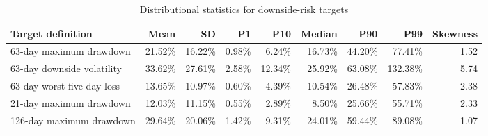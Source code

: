 \begin{table}[!htbp]
    \centering
    \scriptsize
    \setlength{\tabcolsep}{4pt}
    \caption{Distributional statistics for downside-risk targets}
    \label{tab:target_statistics}
    \begin{tabular}{lrrrrrrrr}
        \toprule
        Target definition & Mean & SD & P1 & P10 & Median & P90 & P99 & Skewness \\
        \midrule
        63-day maximum drawdown & 21.52\% & 16.22\% & 0.98\% & 6.24\% & 16.73\% & 44.20\% & 77.41\% & 1.52 \\
        63-day downside volatility & 33.62\% & 27.61\% & 2.58\% & 12.34\% & 25.92\% & 63.08\% & 132.38\% & 5.74 \\
        63-day worst five-day loss & 13.65\% & 10.97\% & 0.60\% & 4.39\% & 10.54\% & 26.48\% & 57.83\% & 2.38 \\
        21-day maximum drawdown & 12.03\% & 11.15\% & 0.55\% & 2.89\% & 8.50\% & 25.66\% & 55.71\% & 2.33 \\
        126-day maximum drawdown & 29.64\% & 20.06\% & 1.42\% & 9.31\% & 24.01\% & 59.44\% & 89.08\% & 1.07 \\
        \bottomrule
    \end{tabular}
\end{table}
